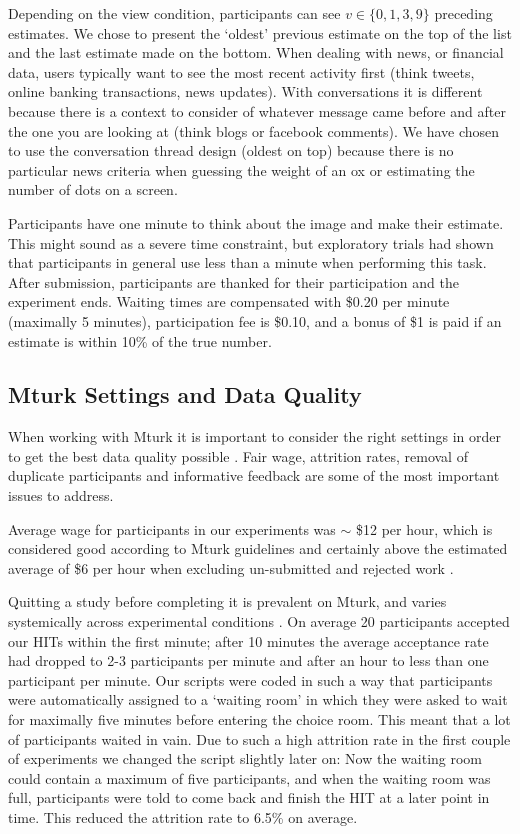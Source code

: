 \documentclass[9pt,twoside,lineno]{pnas-new}
\begin{document}
Depending on the view condition, participants can see $v\in\{0,1,3,9\}$ preceding estimates. We chose to present the ‘oldest’ previous estimate on the top of the list and the last estimate made on the bottom. When dealing with news, or financial data, users typically want to see the most recent activity first (think tweets, online banking transactions, news updates). With conversations it is different because there is a context to consider of whatever message came before and after the one you are looking at (think blogs or facebook comments). We have chosen to use the conversation thread design (oldest on top) because there is no particular news criteria when guessing the weight of an ox or estimating the number of dots on a screen.

Participants have one minute to think about the image and make their estimate. This might sound as a severe time constraint, but exploratory trials had shown that participants in general use less than a minute when performing this task. After submission, participants are thanked for their participation and the experiment ends. Waiting times are compensated with \$0.20 per minute (maximally 5 minutes), participation fee is \$0.10, and a bonus of \$1 is paid if an estimate is within 10\% of the true number.

\subsection*{Mturk Settings and Data Quality}
When working with Mturk it is important to consider the right settings in order to get the best data quality possible \cite{chandler2016conducting}. Fair wage, attrition rates, removal of duplicate participants and informative feedback are some of the most important issues to address.

Average wage for participants in our experiments was $\sim$ \$12 per hour, which is considered good according to Mturk guidelines and certainly above the estimated average of \$6 per hour when excluding un-submitted and rejected work \cite{hara2018data}.

Quitting a study before completing it is prevalent on Mturk, and varies systemically across experimental conditions \cite{zhou2016pitfall}. On average 20 participants accepted our HITs within the first minute; after 10 minutes the average acceptance rate had dropped to 2-3 participants per minute and after an hour to less than one participant per minute. Our scripts were coded in such a way that participants were automatically assigned to a ‘waiting room’ in which they were asked to wait for maximally five minutes before entering the choice room. This meant that a lot of participants waited in vain. Due to such a high attrition rate in the first couple of experiments we changed the script slightly later on: Now the waiting room could contain a maximum of five participants, and when the waiting room was full, participants were told to come back and finish the HIT at a later point in time. This reduced the attrition rate to 6.5\% on average.
\end{document}
